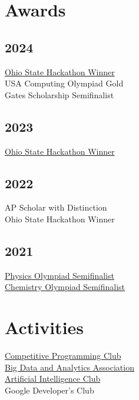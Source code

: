 \documentclass[]{Farhan_Resume_Class}
\begin{document}
\begin{minipage}[t]{0.27\textwidth}
    \sectionsep


    \section{Awards}
    \subsection{2024}
    \href{https://hack.osu.edu/hs/fall-2023/}{Ohio State Hackathon Winner} \\
    USA Computing Olympiad Gold \\
    Gates Scholarship Semifinalist
    \subsection{2023}
    \href{https://hack.osu.edu/hs/fall-2023/}{Ohio State Hackathon Winner} \\

    \subsection{2022}
    {AP Scholar with Distinction} \\
    {Ohio State Hackathon Winner} \\
    \subsection{2021}
    \href{https://www.aapt.org/physicsteam/2024/index.cfm}{Physics Olympiad Semifinalist} \\
    \href{https://www.acs.org/education/students/highschool/olympiad.html}{Chemistry Olympiad Semifinalist} \\

    \section{Activities}
    \href{https://cpcosu.github.io/}{Competitive Programming Club} \\
    \href{https://bdaaosu.org/}{Big Data and Analytics Association} \\
    \href{https://www.osuaiclub.com/}{Artificial Intelligence Club} \\
    Google Developer's Club


\end{minipage}
\end{document}
